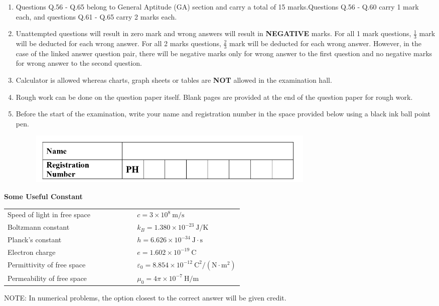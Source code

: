 \documentclass[journal,12pt,onecolumn]{IEEEtran}
\theoremstyle{remark}
\begin{document}
\begin{enumerate}
\item Questions Q.56 - Q.65 belong to General Aptitude (GA) section and carry a total of 15 marks.Questions Q.56 - Q.60 carry 1 mark each, and questions Q.61 - Q.65 carry 2 marks each.

\item Unattempted questions will result in zero mark and wrong answers will result in \textbf{NEGATIVE} marks.  For all 1 mark questions, $\tfrac{1}{3}$ mark will be deducted for each wrong answer. For all 2 marks questions, $\tfrac{2}{3}$ mark will be deducted for each wrong answer.  However, in the case of the linked answer question pair, there will be negative marks only for wrong answer to the first question and no negative marks for wrong answer to the second question.

\item Calculator is allowed whereas charts, graph sheets or tables are \textbf{NOT} allowed in the examination hall.

\item Rough work can be done on the question paper itself. Blank pages are provided at the end of the question paper for rough work.

\item Before the start of the examination, write your name and registration number in the space provided below using a black ink ball point pen.
\begin{figure}[H]
    \centering
    \includegraphics[width = 0.6\columnwidth]{fig/instruction .png}
    \caption*{}
    \label{fig:instruction}
\end{figure}

\end{enumerate}
\newpage
\textbf{Some Useful Constant}

\begin{tabular}{@{}p{0.55\linewidth}l@{}}
Speed of light in free space & $c = 3\times 10^{8}\ \mathrm{m/s}$\\
Boltzmann constant & $k_B = 1.380\times 10^{-23}\ \mathrm{J/K}$\\
Planck's constant & $h = 6.626\times 10^{-34}\ \mathrm{J\cdot s}$\\
Electron charge & $e = 1.602\times 10^{-19}\ \mathrm{C}$\\
Permittivity of free space & $\varepsilon_0 = 8.854\times 10^{-12}\ \mathrm{C^2/(N\cdot m^2)}$\\
Permeability of free space & $\mu_0 = 4\pi\times 10^{-7}\ \mathrm{H/m}$\\
\end{tabular}
\vspace{0.5mm}
NOTE: In numerical problems, the option closest to the correct answer will be given credit.
\end{document}
